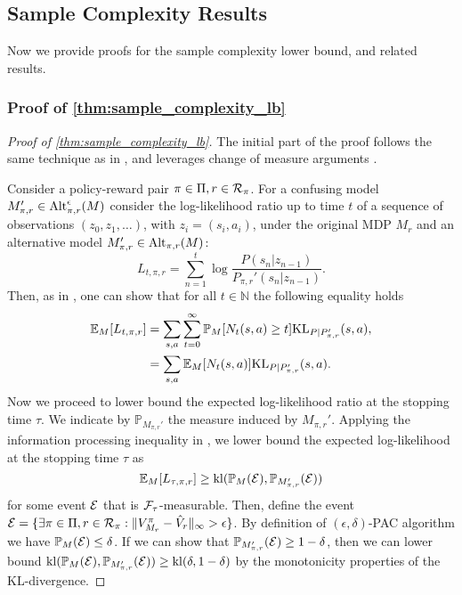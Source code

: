 \subsection{Sample Complexity Results}\label{app:subsec:sample_complexity}
Now we provide proofs for the sample complexity lower bound, and related results.
\subsubsection{Proof of \cref{thm:sample_complexity_lb}}\label{app:thm:sample_complexity_lb}
\begin{proof}[Proof of \cref{thm:sample_complexity_lb}]
The initial part of the proof follows the same technique as in \cite{al2021navigating,russo2023model}, and leverages change of measure arguments \cite{lai1985asymptotically, garivier2016optimal}.

Consider a policy-reward pair $\pi\in \Pi, r\in {\cal R}_\pi$.
 For a confusing model $M_{\pi,r}'\in {\rm Alt}_{\pi,r}^\epsilon(M)$ consider the log-likelihood ratio up to time $t$ of a sequence of observations $(z_0,z_1,\dots)$, with $z_i = (s_i,a_i)$,  under the original MDP $M_r$ and an alternative model $M_{\pi,r}'\in {\rm Alt}_{\pi,r}(M)$:
 \[
    L_{t,\pi,r}= \sum_{n=1}^t \log\frac{P(s_n|z_{n-1})}{P_{\pi,r}'(s_n|z_{n-1})}.
    \]
Then, as in \cite{russo2023model}, one can show that for all $t\in \mathbb{N}$ the following equality holds
\begin{align*}
\mathbb{E}_{M}[L_{t,\pi,r}] &= \sum_{s,a}\sum_{t=0}^\infty \mathbb{P}_{M}[N_t(s,a)\geq t]{\rm KL}_{P|P_{\pi,r}'}(s,a),\\
&=  \sum_{s,a}\mathbb{E}_{M}[N_t(s,a)]{\rm KL}_{P|P_{\pi,r}'}(s,a).
\end{align*}
Now we proceed to lower bound the expected log-likelihood ratio at the stopping time $\tau$.  We indicate by $\mathbb{P}_{M_{\pi,r}'}$ the measure induced by $M_{\pi,r}'$. Applying the information processing inequality in \cite{kaufmann2016complexity},   we  lower bound the expected log-likelihood at the stopping time $\tau$ as
\[
\mathbb{E}_{M}[L_{\tau,\pi,r}] \geq {\rm kl}(\mathbb{P}_{M}({\cal E}), \mathbb{P}_{M_{\pi,r}'}({\cal E}))
\]
for some event ${\cal E}$ that is ${\cal F}_\tau$-measurable.
Then, define the event
 ${\cal E}=\{\exists \pi\in \Pi,r\in {\cal R}_\pi: \|V_{M_r}^\pi - \hat V_r\|_\infty > \epsilon\}$. By definition of $(\epsilon,\delta)$-PAC algorithm we have $\mathbb{P}_M({\cal E})\leq \delta$. If we can show that $\mathbb{P}_{M_{\pi,r}'}({\cal E})\geq 1-\delta$, then we can lower bound ${\rm kl}(\mathbb{P}_{M}({\cal E}), \mathbb{P}_{M_{\pi,r}'}({\cal E}))\geq {\rm kl}(\delta,1-\delta)$ by the monotonicity properties of the KL-divergence.


\end{proof}
